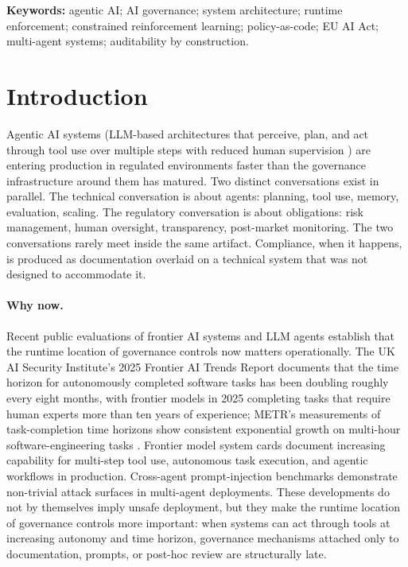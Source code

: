 \documentclass[11pt,a4paper]{article}
\theoremstyle{remark}
\begin{document}
\noindent\textbf{Keywords:} agentic AI; AI governance; system architecture; runtime enforcement; constrained reinforcement learning; policy-as-code; EU AI Act; multi-agent systems; auditability by construction.

\section{Introduction}\label{sec:intro}

Agentic AI systems (LLM-based architectures that perceive, plan, and act through tool use over multiple steps with reduced human supervision \cite{yao2023react,schick2023toolformer,shinn2024reflexion,wang2024voyager}) are entering production in regulated environments faster than the governance infrastructure around them has matured. Two distinct conversations exist in parallel. The technical conversation is about agents: planning, tool use, memory, evaluation, scaling. The regulatory conversation is about obligations: risk management, human oversight, transparency, post-market monitoring. The two conversations rarely meet inside the same artifact. Compliance, when it happens, is produced as documentation overlaid on a technical system that was not designed to accommodate it.

\paragraph{Why now.} Recent public evaluations of frontier AI systems and LLM agents establish that the runtime location of governance controls now matters operationally. The UK AI Security Institute's 2025 Frontier AI Trends Report \cite{aisi2025trends} documents that the time horizon for autonomously completed software tasks has been doubling roughly every eight months, with frontier models in 2025 completing tasks that require human experts more than ten years of experience; METR's measurements of task-completion time horizons show consistent exponential growth on multi-hour software-engineering tasks \cite{metr2025horizon}. Frontier model system cards \cite{anthropic2025opus45card} document increasing capability for multi-step tool use, autonomous task execution, and agentic workflows in production. Cross-agent prompt-injection benchmarks \cite{debenedetti2024agentdojo} demonstrate non-trivial attack surfaces in multi-agent deployments. These developments do not by themselves imply unsafe deployment, but they make the runtime location of governance controls more important: when systems can act through tools at increasing autonomy and time horizon, governance mechanisms attached only to documentation, prompts, or post-hoc review are structurally late.
\end{document}
